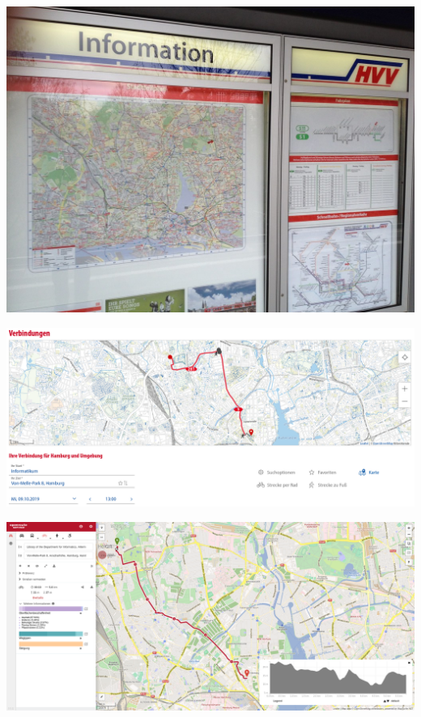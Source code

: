 \documentclass{beamer}
\begin{document}
	\begin{frame}
		\vfill
		\includegraphics[width=\linewidth]{images/hvv-haltestelle}
		\vfill
	\end{frame}
	
	\begin{frame}
		\vspace{1cm}
		\vfill
		\includegraphics[width=\linewidth]{images/hvv-website}
		\vfill
	\end{frame}

	\begin{frame}
		\vspace{1cm}
		\vfill
		\includegraphics[width=\linewidth]{images/openrouteservice}
		\vfill
	\end{frame}
\end{document}
